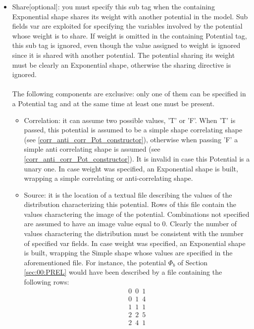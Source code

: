 \begin{itemize}
\begin{itemize}
\end{itemize}
\item Share[optional]: you must specify this sub tag when the containing Exponential shape shares its weight with another potential in the model. 
Sub fields var are exploited for specifying the variables involved by the potential whose weight is to share. If weight is omitted in the containing Potential tag, this sub tag is ignored, even though the value assigned to weight is ignored since it is shared with another potential.
The potential sharing its weight must be clearly an Exponential shape, otherwise the sharing directive is ignored.
\\
\\
The following components are exclusive: only one of them can be specified in a Potential tag and at the same time at least one must be present.
\begin{itemize}
\item Correlation: it can assume two possible values, 'T' or 'F'. When 'T' is passed, this potential is assumed to be a simple shape correlating shape (see \ref{corr_anti_corr_Pot_constructor}), otherwise when passing 'F' a simple anti correlating shape is assumed (see \ref{corr_anti_corr_Pot_constructor}).
It is invalid in case this Potential is a unary one.
In case weight was specified, an Exponential shape is built, wrapping a simple correlating or anti-correlating shape.
\item Source: it is the location of a textual file describing the values of the distribution characterizing this potential.
Rows of this file contain the values charactering the image of the potential. 
Combinations not specified are assumed to have an image value equal to 0.
Clearly the number of values charactering the distribution must be consistent with the number of specified var fields.
In case weight was specified, an Exponential shape is built, wrapping the Simple shape whose values are specified in the aforementioned file.
For instance, the potential $\Phi _b$ of Section \ref{sec:00:PREL} would have been described by a file containing the following rows:
\begin{eqnarray}
0 \,\,\, 0 \,\,\, 1 \nonumber\\
0 \,\,\, 1 \,\,\, 4 \nonumber\\
1  \,\,\,1  \,\,\,1 \nonumber\\
2  \,\,\,2  \,\,\,5 \nonumber\\
2  \,\,\,4  \,\,\,1 \nonumber\\
\label{eq:00:XML_struct:shape_txt}

\end{eqnarray}
\end{itemize}
\end{itemize}
